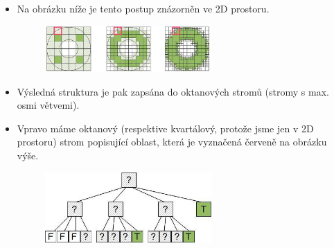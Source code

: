 \begin{itemize}
	\item Na obrázku níže je tento postup znázorněn ve 2D prostoru.
		\begin{figure}[H]
		\centering
		\includegraphics[width=0.6\textwidth]{assets/4_octan2}
		\end{figure}
	\item Výsledná struktura je pak zapsána do oktanových stromů (stromy s max. osmi větvemi).
	\item Vpravo máme oktanový (respektive kvartálový, protože jsme jen v 2D prostoru) strom popisující oblast, která je vyznačená červeně na obrázku výše.
		\begin{figure}[H]
		\centering
		\includegraphics[width=0.6\textwidth]{assets/4_octan_struct}
		\end{figure}
\end{itemize}
